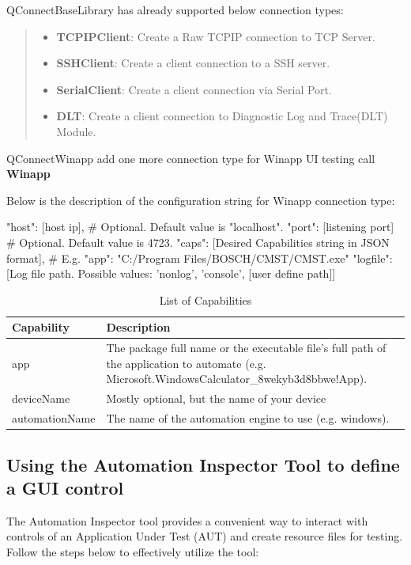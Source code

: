 QConnectBaseLibrary has already
supported below connection types:

\begin{quote}
\begin{itemize}
\tightlist
\item
  \textbf{TCPIPClient}: Create a Raw TCPIP connection to TCP Server.
\item
  \textbf{SSHClient}: Create a client connection to a SSH server.
\item
  \textbf{SerialClient}: Create a client connection via Serial Port.
\item
  \textbf{DLT}: Create a client connection to Diagnostic Log and Trace(DLT) Module.
\end{itemize}
\end{quote}

QConnectWinapp add one more connection type for Winapp UI testing call \textbf{Winapp}


Below is the description of the configuration string for Winapp connection type:


\begin{robotcode}
{
    "host": [host ip],     # Optional. Default value is "localhost".
    "port": [listening port]  # Optional. Default value is 4723.
    "caps": [Desired Capabilities string in JSON format],  # E.g. { "app": "C:/Program Files/BOSCH/CMST/CMST.exe"}
    "logfile": [Log file path. Possible values: 'nonlog', 'console', [user define path]]
}
\end{robotcode}

\begin{table}[h]
\centering
\caption{List of Capabilities}
\begin{tabular}{|p{3cm}|p{9cm}|}
\hline
\textbf{Capability} & \textbf{Description} \\
\hline
app & The package full name or the executable file's full path of the application to automate (e.g. Microsoft.WindowsCalculator\_8wekyb3d8bbwe!App). \\
\hline
deviceName & Mostly optional, but the name of your device \\
\hline
automationName & The name of the automation engine to use (e.g. windows). \\
\hline
\end{tabular}
\end{table}


\hypertarget{definition}{%
\subsection{\texorpdfstring{\textbf{Using the Automation Inspector Tool to define a GUI control}}{definition}}\label{definition}}
The Automation Inspector tool provides a convenient way to interact with controls of an Application Under Test (AUT) and create resource files for testing. Follow the steps below to effectively utilize the tool:

